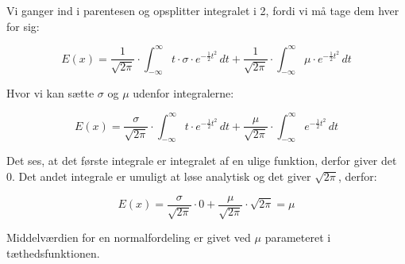 \begin{proofw}
Vi ganger ind i parentesen og opsplitter integralet i 2,
fordi vi må tage dem hver for sig:

$$
E(x)=\frac{1}{\sqrt{2\pi}} \cdot
\int_{-\infty}^{\infty}
    t \cdot \sigma
    \cdot e^{
        -\frac{1}{2} t^2
    }
    \,dt
    +
\frac{1}{\sqrt{2\pi}} \cdot
\int_{-\infty}^{\infty}
    \mu
    \cdot e^{
        -\frac{1}{2} t^2
    }
    \,dt
$$

Hvor vi kan sætte $\sigma$ og $\mu$ udenfor integralerne:

$$
E(x)=\frac{\sigma}{\sqrt{2\pi}} \cdot
\int_{-\infty}^{\infty}
    t
    \cdot e^{
        -\frac{1}{2} t^2
    }
    \,dt
    +
\frac{\mu}{\sqrt{2\pi}} \cdot
\int_{-\infty}^{\infty}
    e^{
        -\frac{1}{2} t^2
    }
    \,dt
$$

Det ses, at det første integrale er integralet af en ulige funktion,
derfor giver det 0. Det andet integrale er umuligt at
løse analytisk og det giver $\sqrt{2\pi}$, derfor:

$$
E(x)=\frac{\sigma}{\sqrt{2\pi}} \cdot
0
    +
\frac{\mu}{\sqrt{2\pi}} \cdot
\sqrt{2\pi}=\mu
$$

Middelværdien for en normalfordeling er givet ved $\mu$ parameteret
i tæthedsfunktionen.

\end{proofw}
